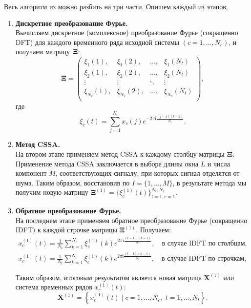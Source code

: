 \documentclass[specialist,
               substylefile = spbu.rtx,
               subf,href,colorlinks=true, 12pt]{disser}
\newcommand{\I}{\mathrm{i}}
\begin{document}
    Весь алгоритм из \cite{Trickett2003} можно разбить на три части.
    Опишем каждый из этапов.

\begin{enumerate}
\item
{\bf Дискретное преобразование Фурье.\\}
    Вычисляем дискретное (комплексное) преобразование Фурье (сокращенно DFT)
    для каждого временного ряда исходной системы $(c=1, \ldots, N_c)$,
    и получаем матрицу $\bf\Xi$:
\begin{equation*}
\mathbf\Xi =
\left(
\begin{array}{cccc}
    \xi_1(1), & \xi_1(2), & \ldots, & \xi_1(N_t)\\
    \xi_2(1), & \xi_2(2), & \ldots, & \xi_2(N_t)\\
    \vdots & \vdots & \ddots & \vdots\\
    \xi_{N_c}(1), & \xi_{N_c}(2), & \ldots, & \xi_{N_c}(N_t)\\
\end{array}
\right),
\end{equation*}
   где
\begin{equation*}
    \xi_c(t) = \sum_{j=1}^{N_t}x_c(j)e^{-2\pi \I \frac{(j-1)(t-1)}{N_t}}.
\end{equation*}

\item
{\bf Метод CSSA.\\}
На втором этапе применяем метод CSSA
 к каждому столбцу матрицы $\bf\Xi$.
Применение метода CSSA заключается в выборе длины окна $L$ и числа компонент $M$, соответствующих сигналу,  при которых сигнал отделятся от шума.
Таким образом, восстановив по $I = \{1,\ldots,M\}$, в результате метода мы получим новую матрицу $\mathbf{\Xi}^{(1)} = \{\xi^{(1)}_c(t)\}_{t=1, c=1}^{N_t, N_c}$.

\item
{\bf Обратное преобразование Фурье.\\}
На последнем этапе применяем обратное преобразование Фурье (сокращенно IDFT)
к каждой строчке матрицы $\mathbf{\Xi}^{(1)}$.
Получаем:
\begin{gather*}
     x_c^{(1)}(t) = \frac{1}{N_c}\sum_{k=1}^{N_c}\xi_c^{(1)}(k)e^{2\pi \I \frac{(t-1)(k-1)}{N_c}},
    \quad \text{в случае IDFT по столбцам}, \\
     x_c^{(1)}(t) = \frac{1}{N_t}\sum_{k=1}^{N_t}\xi_c^{(1)}(k)e^{2\pi \I \frac{(t-1)(k-1)}{N_t}},
    \quad \text{в случае IDFT по строчкам},
\end{gather*}

Таким образом, итоговым результатом является новая матрица $\mathbf{X}^{(1)}$ или система временных рядов $x_c^{(1)}(t)$:
\begin{equation*}
    \mathbf{X}^{(1)}=\left\{x_c^{(1)}(t) \; | \; c=1, \ldots, N_c, \; t=1, \ldots, N_t\right\}.
\end{equation*}
\end{enumerate}
\end{document}
